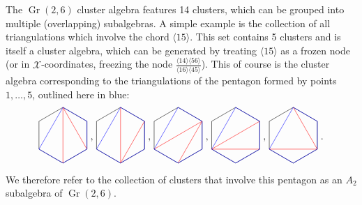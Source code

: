 \documentclass[11pt]{article}
\DeclareMathOperator{\Gr}{Gr}
\def\ket#1{\langle #1 \rangle}
\def\xcoords{$\mathcal{X}$-coordinates}
\def\drawHexagon{
\coordinate (P1) at (90:1);
\coordinate (P2) at (30:1);
\coordinate (P3) at (330:1);
\coordinate (P4) at (270:1);
\coordinate (P5) at (210:1);
\coordinate (P6) at (150:1);
\draw (P1) -- (P2) -- (P3) -- (P4) -- (P5) -- (P6) -- cycle;
}
\begin{document}
The $\Gr(2,6)$ cluster algebra features 14 clusters, which can be grouped into multiple (overlapping) subalgebras. A simple example is the collection of all triangulations which involve the chord $\ket{15}$. This set contains 5 clusters and is itself a cluster algebra, which can be generated by treating $\ket{15}$ as a frozen node (or in \xcoords, freezing the node $\frac{\ket{14}\ket{56}}{\ket{16}\ket{45}}$). This of course is the cluster algebra corresponding to the triangulations of the pentagon formed by points $1,\ldots,5$, outlined here in blue:
\begin{equation}
\begin{gathered}
\begin{tikzpicture}
	\drawHexagon
  	\draw[color=red] (P1) -- (P3);
  	\draw[color=red] (P1) -- (P4);
	\draw[color=blue] (P1) -- (P2) -- (P3) -- (P4) -- (P5) -- cycle;
\end{tikzpicture} 
\end{gathered}
{\ ,\ }
\begin{gathered}
\begin{tikzpicture}
	\begin{scope}[xshift=2cm]
	\drawHexagon
  	\draw[color=red] (P2) -- (P4);
  	\draw[color=red] (P1) -- (P4);
	\draw[color=blue] (P1) -- (P2) -- (P3) -- (P4) -- (P5) -- cycle;
	\end{scope}
\end{tikzpicture} 
\end{gathered}
{\ ,\ }
\begin{gathered}
\begin{tikzpicture}
	\begin{scope}[xshift=4cm]
	\drawHexagon
  	\draw[color=red] (P2) -- (P4);
  	\draw[color=red] (P2) -- (P5);
	\draw[color=blue] (P1) -- (P2) -- (P3) -- (P4) -- (P5) -- cycle;
	\end{scope}
\end{tikzpicture} 
\end{gathered}
{\ ,\ }
\begin{gathered}
\begin{tikzpicture}
	\begin{scope}[xshift=6cm]
	\drawHexagon
  	\draw[color=red] (P2) -- (P5);
  	\draw[color=red] (P3) -- (P5);
	\draw[color=blue] (P1) -- (P2) -- (P3) -- (P4) -- (P5) -- cycle;
	\end{scope}
\end{tikzpicture} 
\end{gathered}
{\ ,\ }
\begin{gathered}
\begin{tikzpicture}
	\begin{scope}[xshift=8cm]
	\drawHexagon
  	\draw[color=red] (P1) -- (P3);
  	\draw[color=red] (P3) -- (P5);
	\draw[color=blue] (P1) -- (P2) -- (P3) -- (P4) -- (P5) -- cycle;
	\end{scope}
\end{tikzpicture}
\end{gathered}\ .
\end{equation}
We therefore refer to the collection of clusters that involve this pentagon as an $A_2$ subalgebra of $\Gr(2,6)$. 
\end{document}
